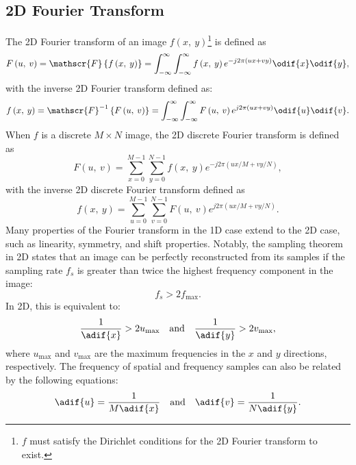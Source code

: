 \documentclass{article}
\begin{document}
\subsection{2D Fourier Transform}
The 2D Fourier transform of an image \(f\left( x,\: y \right)\)\footnote{\(f\) must satisfy the Dirichlet conditions for the 2D Fourier transform to exist.}
is defined as
\begin{equation*}
    F\left( u,\: v \right) = \mathscr{F}\left\{ f\left( x,\: y \right) \right\} = \int_{-\infty}^{\infty} \int_{-\infty}^{\infty} f\left( x,\: y \right) e^{-j2\pi\left( ux + vy \right)} \odif{x} \odif{y},
\end{equation*}
with the inverse 2D Fourier transform defined as:
\begin{equation*}
    f\left( x,\: y \right) = \mathscr{F}^{-1}\left\{ F\left( u,\: v \right) \right\} = \int_{-\infty}^{\infty} \int_{-\infty}^{\infty} F\left( u,\: v \right) e^{j2\pi\left( ux + vy \right)} \odif{u} \odif{v}.
\end{equation*}
When \(f\) is a discrete \(M \times N\) image, the 2D discrete Fourier
transform is defined as
\begin{equation*}
    F\left( u,\: v \right) = \sum_{x = 0}^{M-1} \sum_{y = 0}^{N-1} f\left( x,\: y \right) e^{-j2\pi\left( ux/M + vy/N \right)},
\end{equation*}
with the inverse 2D discrete Fourier transform defined as
\begin{equation*}
    f\left( x,\: y \right) = \sum_{u = 0}^{M-1} \sum_{v = 0}^{N-1} F\left( u,\: v \right) e^{j2\pi\left( ux/M + vy/N \right)}.
\end{equation*}
Many properties of the Fourier transform in the 1D case extend to the 2D
case, such as linearity, symmetry, and shift properties. Notably, the
sampling theorem in 2D states that an image can be perfectly
reconstructed from its samples if the sampling rate \(f_s\) is greater
than twice the highest frequency component in the image:
\begin{equation*}
    f_s > 2f_{\text{max}}.
\end{equation*}
In 2D, this is equivalent to:
\begin{equation*}
    \frac{1}{\adif{x}} > 2 u_{\text{max}} \quad \text{and} \quad \frac{1}{\adif{y}} > 2 v_{\text{max}},
\end{equation*}
where \(u_{\text{max}}\) and \(v_{\text{max}}\) are the maximum
frequencies in the \(x\) and \(y\) directions, respectively. The
frequency of spatial and frequency samples can also be related by the
following equations:
\begin{equation*}
    \adif{u} = \frac{1}{M\adif{x}} \quad \text{and} \quad \adif{v} = \frac{1}{N\adif{y}}.
\end{equation*}
\end{document}
